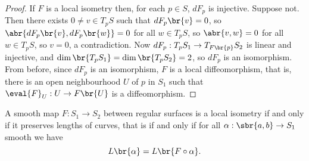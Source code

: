 \begin{proof}
If $ F $ is a local isometry then, for each $ p \in S $, $ dF_p $ is injective. Suppose not. Then there exists $ 0 \ne v \in T_pS $ such that $ dF_p\br{v} = 0 $, so $ \abr{dF_p\br{v}, dF_p\br{w}} = 0 $ for all $ w \in T_pS $, so $ \abr{v, w} = 0 $ for all $ w\in T_pS $, so $ v = 0 $, a contradiction. Now $ dF_p : T_pS_1 \to T_{F\br{p}}S_2 $ is linear and injective, and $ \dim\br{T_pS_1} = \dim\br{T_pS_2} = 2 $, so $ dF_p $ is an isomorphism. From before, since $ dF_p $ is an isomorphism, $ F $ is a local diffeomorphism, that is, there is an open neighbourhood $ U $ of $ p $ in $ S_1 $ such that $ \eval{F}_U : U \to F\br{U} $ is a diffeomorphism.
\end{proof}

\begin{proposition}
A smooth map $ F : S_1 \to S_2 $ between regular surfaces is a local isometry if and only if it preserves lengths of curves, that is if and only if for all $ \alpha : \sbr{a, b} \to S_1 $ smooth we have
$$ L\br{\alpha} = L\br{F \circ \alpha}. $$
\end{proposition}

